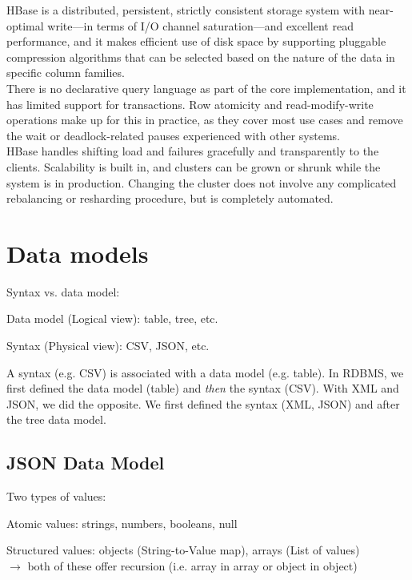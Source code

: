 \documentclass[11pt,oneside,a4paper]{article}
\begin{document}
HBase is a distributed, persistent, strictly consistent storage system with near-optimal write—in terms of I/O channel saturation—and excellent read performance, and it makes efficient use of disk space by supporting pluggable compression algorithms that can be selected based on the nature of the data in specific column families.\\
There is no declarative query language as part of the core implementation, and it has limited support for transactions. Row atomicity and read-modify-write operations make up for this in practice, as they cover most use cases and remove the wait or deadlock-related pauses experienced with other systems.\\
HBase handles shifting load and failures gracefully and transparently to the clients. Scalability is built in, and clusters can be grown or shrunk while the system is in production. Changing the cluster does not involve any complicated rebalancing or resharding procedure, but is completely automated.

\newpage

\section{Data models}

Syntax vs. data model:

\begin{compactitem}
	\item Data model (Logical view): table, tree, etc.
	\item Syntax (Physical view): CSV, JSON, etc.
\end{compactitem}

A syntax (e.g. CSV) is associated with a data model (e.g. table). In RDBMS, we first defined the data model (table) and \textit{then} the syntax (CSV). With XML and JSON, we did the opposite. We first defined the syntax (XML, JSON) and after the tree data model.

\subsection{JSON Data Model}

Two types of values:

\begin{compactitem}
	\item Atomic values: strings, numbers, booleans, null
	\item Structured values: objects (String-to-Value map), arrays (List of values)\\
	$\rightarrow$ both of these offer recursion (i.e. array in array or object in object)
\end{compactitem}
\end{document}
